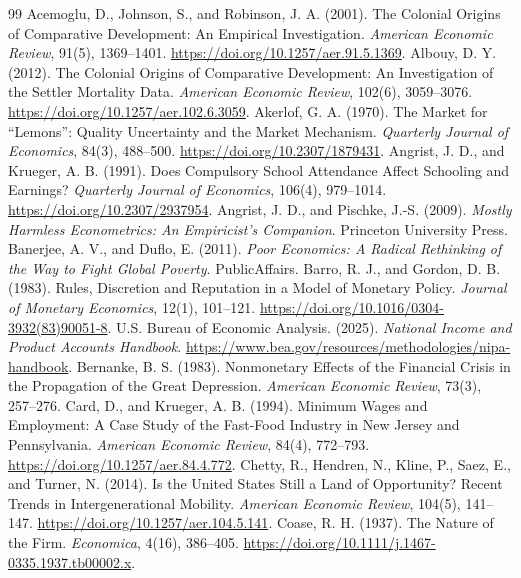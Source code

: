 \documentclass[11pt,oneside,openany]{book}
\begin{document}
\begin{thebibliography}{99}
 Acemoglu, D., Johnson, S., and Robinson, J. A. (2001). The Colonial Origins of Comparative Development: An Empirical Investigation. \emph{American Economic Review}, 91(5), 1369--1401. \url{https://doi.org/10.1257/aer.91.5.1369}.
 Albouy, D. Y. (2012). The Colonial Origins of Comparative Development: An Investigation of the Settler Mortality Data. \emph{American Economic Review}, 102(6), 3059--3076. \url{https://doi.org/10.1257/aer.102.6.3059}.
 Akerlof, G. A. (1970). The Market for ``Lemons'': Quality Uncertainty and the Market Mechanism. \emph{Quarterly Journal of Economics}, 84(3), 488--500. \url{https://doi.org/10.2307/1879431}.
 Angrist, J. D., and Krueger, A. B. (1991). Does Compulsory School Attendance Affect Schooling and Earnings? \emph{Quarterly Journal of Economics}, 106(4), 979--1014. \url{https://doi.org/10.2307/2937954}.
 Angrist, J. D., and Pischke, J.-S. (2009). \emph{Mostly Harmless Econometrics: An Empiricist's Companion}. Princeton University Press.
 Banerjee, A. V., and Duflo, E. (2011). \emph{Poor Economics: A Radical Rethinking of the Way to Fight Global Poverty}. PublicAffairs.
 Barro, R. J., and Gordon, D. B. (1983). Rules, Discretion and Reputation in a Model of Monetary Policy. \emph{Journal of Monetary Economics}, 12(1), 101--121. \url{https://doi.org/10.1016/0304-3932(83)90051-8}.
 U.S. Bureau of Economic Analysis. (2025). \emph{National Income and Product Accounts Handbook}. \url{https://www.bea.gov/resources/methodologies/nipa-handbook}.
 Bernanke, B. S. (1983). Nonmonetary Effects of the Financial Crisis in the Propagation of the Great Depression. \emph{American Economic Review}, 73(3), 257--276.
 Card, D., and Krueger, A. B. (1994). Minimum Wages and Employment: A Case Study of the Fast-Food Industry in New Jersey and Pennsylvania. \emph{American Economic Review}, 84(4), 772--793. \url{https://doi.org/10.1257/aer.84.4.772}.
 Chetty, R., Hendren, N., Kline, P., Saez, E., and Turner, N. (2014). Is the United States Still a Land of Opportunity? Recent Trends in Intergenerational Mobility. \emph{American Economic Review}, 104(5), 141--147. \url{https://doi.org/10.1257/aer.104.5.141}.
 Coase, R. H. (1937). The Nature of the Firm. \emph{Economica}, 4(16), 386--405. \url{https://doi.org/10.1111/j.1467-0335.1937.tb00002.x}.

\end{thebibliography}
\end{document}
